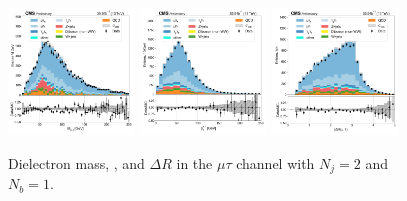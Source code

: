 \begin{figure}[htb!]
    \centering
    \includegraphics[width=0.3\textwidth]{chapters/Analysis/sectionPlots/figures/data_mc_overlays/mutau_2016_cat_eq2_eq1_signal_linear_lepton_dilepton1_mass}
    \includegraphics[width=0.3\textwidth]{chapters/Analysis/sectionPlots/figures/data_mc_overlays/mutau_2016_cat_eq2_eq1_signal_linear_lepton_dilepton1_pt}
    \includegraphics[width=0.3\textwidth]{chapters/Analysis/sectionPlots/figures/data_mc_overlays/mutau_2016_cat_eq2_eq1_signal_linear_lepton_dilepton1_delta_r}
    \caption{Dielectron mass, \pt, and $\Delta R$ in the $\mu\tau$ channel
    with $N_{j} = 2$ and $N_{b} = 1$.}
    \label{fig:analysis:plots:mutau_5_dilepton}
\end{figure}

